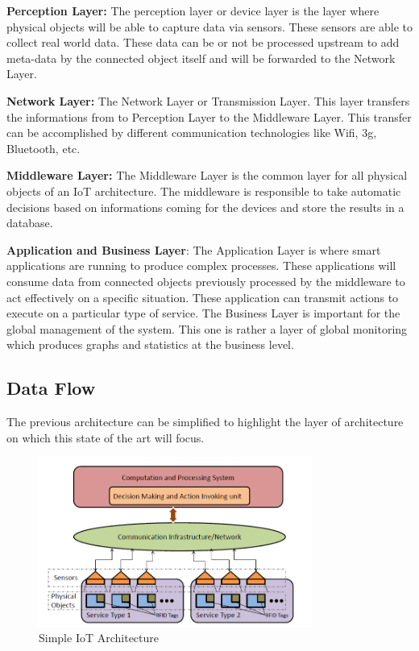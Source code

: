 \documentclass[11pt]{article}
\begin{document}
\textbf{Perception Layer:} The perception layer or device layer is the layer where physical objects will be able to capture data via sensors. These sensors are able to collect real world data. These data can be or not be processed upstream to add meta-data by the connected object itself and will be forwarded to the Network Layer.

\textbf{Network Layer:} The Network Layer or Transmission Layer. This layer transfers the informations from to Perception Layer to the Middleware Layer. This transfer can be accomplished by different communication technologies like Wifi, 3g, Bluetooth, etc.

\textbf{Middleware Layer:} The Middleware Layer is the common layer for all physical objects of an IoT architecture. The middleware is responsible to take automatic decisions based on informations coming for the devices and store the results in a database. 

\textbf{Application and Business Layer}: The Application Layer is where smart applications are running to produce complex processes. These applications will consume data from connected objects previously processed by the middleware to act effectively on a specific situation. These application can transmit actions to execute on a particular type of service. The Business Layer is important for the global management of the system. This one is rather a layer of global monitoring which produces graphs and statistics at the business level.

\subsection{Data Flow}

The previous architecture can be simplified to highlight the layer of architecture on which this state of the art will focus.

\begin{figure}[h]
	\includegraphics[width=0.8\textwidth]{assets/Basic_IOT_Architecture.png} 
	\caption{Simple IoT Architecture}
	\label{fig:simpleArchitecture}
\end{figure}
\end{document}
